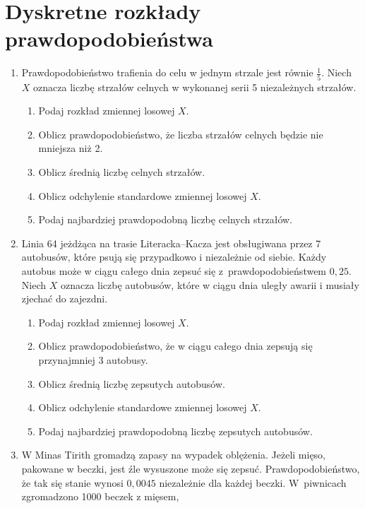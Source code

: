 \documentclass{mwart}
\newcommand{\ans}[1]{}
\newcommand{\ans}[1]{\emph{Odpowiedź:} #1}
\begin{document}
\section{Dyskretne rozkłady prawdopodobieństwa}
\begin{enumerate}
\item Prawdopodobieństwo trafienia do celu w jednym strzale jest równie $\frac{1}{5}$. Niech $X$ oznacza liczbę strzałów celnych w wykonanej serii 5 niezależnych strzałów. 
\begin{enumerate}
\item Podaj rozkład zmiennej losowej $X$. \ans{$P(X=k)={5 \choose k}\frac{4^{5-k}}{5^5}$}
\item Oblicz prawdopodobieństwo, że liczba strzałów celnych będzie nie mniejsza niż 2. \ans{$P(X\geq 2)=1-P(X=0)-P(X=1)=1-\frac{4^5}{5^5}-5\cdot\frac{4^4}{5^5}=\frac{821}{3125}\approx0{,}263$}
\item Oblicz średnią liczbę celnych strzałów. \ans{$EX=np=1$}
\item Oblicz odchylenie standardowe zmiennej losowej $X$. \ans{$DX=\sqrt{np(1-p)}=\sqrt{\frac{4}{5}}$}
\item Podaj najbardziej prawdopodobną liczbę celnych strzałów. \ans{$\lfloor(n+1)p\rfloor=1$}
\end{enumerate}
\item Linia 64 jeżdżąca na trasie Literacka--Kacza jest obsługiwana przez 7 autobusów, które psują się przypadkowo i niezależnie od siebie. Każdy autobus może w ciągu całego dnia zepsuć się z~prawdopodobieństwem $0{,}25$. Niech $X$ oznacza liczbę autobusów, które w ciągu dnia uległy awarii i musiały zjechać do zajezdni.
\begin{enumerate}
\item Podaj rozkład zmiennej losowej $X$.
\item Oblicz prawdopodobieństwo, że w ciągu całego dnia zepsują się przynajmniej 3 autobusy.
\item Oblicz średnią liczbę zepsutych autobusów.
\item Oblicz odchylenie standardowe zmiennej losowej $X$.
\item Podaj najbardziej prawdopodobną liczbę zepsutych autobusów. \ans{$(n+1)p-1=1, (n+1)p=2$}
\end{enumerate}
\item W Minas Tirith gromadzą zapasy na wypadek oblężenia. Jeżeli mięso,
pakowane w beczki, jest źle wysuszone może się zepsuć. Prawdopodobieństwo, że
tak się stanie wynosi $0{,}0045$ niezależnie dla każdej beczki. W~piwnicach zgromadzono 1000 beczek z mięsem,

\end{enumerate}
\end{document}
